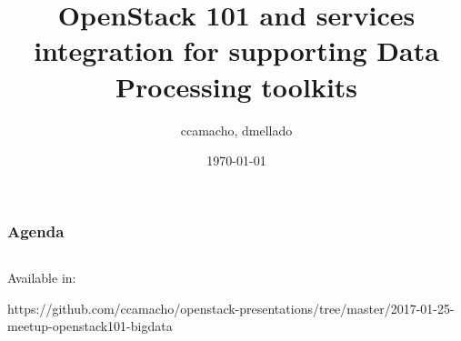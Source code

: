 \documentclass{beamer}
\title[OpenStack 101 and BigData]{OpenStack 101 and services integration for supporting Data Processing toolkits}
\author{ccamacho, dmellado}
\institute[Red Hat]
{
Red Hat \\
\medskip
\textit{ccamacho@redhat.com, dmellado@redhat.com}
}
\date{\today}
\begin{document}
\begin{frame}
\titlepage 
\end{frame}
\begin{frame}
	\frametitle{Agenda}
    \begin{columns}[t]
    	\begin{column}{.5\textwidth}
    		\tableofcontents[sections={1-2}]
    	\end{column}
    	\begin{column}{.5\textwidth}
    		\tableofcontents[sections={3-4}]
    	\end{column}
    \end{columns}
    
    \vspace{1cm}
    Available in:
    
     https://github.com/ccamacho/openstack-presentations/tree/master/2017-01-25-meetup-openstack101-bigdata
\end{frame}





\end{document}
